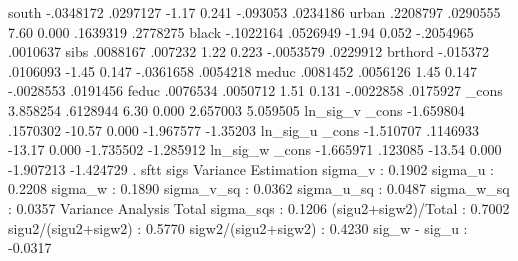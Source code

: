         south {\VBAR}  -.0348172   .0297127    -1.17   0.241     -.093053    .0234186
         urban {\VBAR}   .2208797   .0290555     7.60   0.000     .1639319    .2778275
         black {\VBAR}  -.1022164   .0526949    -1.94   0.052    -.2054965    .0010637
          sibs {\VBAR}   .0088167    .007232     1.22   0.223    -.0053579    .0229912
       brthord {\VBAR}   -.015372   .0106093    -1.45   0.147    -.0361658    .0054218
         meduc {\VBAR}   .0081452   .0056126     1.45   0.147    -.0028553    .0191456
         feduc {\VBAR}   .0076534   .0050712     1.51   0.131    -.0022858    .0175927
         _cons {\VBAR}   3.858254   .6128944     6.30   0.000     2.657003    5.059505
ln_sig_v       {\VBAR}
         _cons {\VBAR}  -1.659804   .1570302   -10.57   0.000    -1.967577    -1.35203
ln_sig_u       {\VBAR}
         _cons {\VBAR}  -1.510707   .1146933   -13.17   0.000    -1.735502   -1.285912
ln_sig_w       {\VBAR}
         _cons {\VBAR}  -1.665971    .123085   -13.54   0.000    -1.907213   -1.424729
{\smallskip}
. sftt sigs
{\smallskip}
               Variance Estimation          
sigma_v    :       0.1902
sigma_u    :       0.2208
sigma_w    :       0.1890
sigma_v_sq :       0.0362
sigma_u_sq :       0.0487
sigma_w_sq :       0.0357
               Variance Analysis          
Total sigma_sqs     :  0.1206
(sigu2+sigw2)/Total :  0.7002
sigu2/(sigu2+sigw2) :  0.5770
sigw2/(sigu2+sigw2) :  0.4230
sig_w - sig_u       : -0.0317
